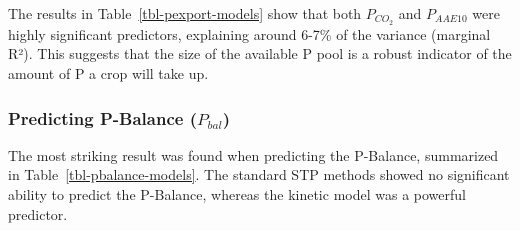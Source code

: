 \documentclass[
  a4paper,
]{article}
\begin{document}
The results in Table~\ref{tbl-pexport-models} show that both
\(P_{CO_2}\) and \(P_{AAE10}\) were highly significant predictors,
explaining around 6-7\% of the variance (marginal R²). This suggests
that the size of the available P pool is a robust indicator of the
amount of P a crop will take up.

\subsubsection{\texorpdfstring{Predicting P-Balance
(\(P_{bal}\))}{Predicting P-Balance (P\_\{bal\})}}\label{sec-pbalance}

The most striking result was found when predicting the P-Balance,
summarized in Table~\ref{tbl-pbalance-models}. The standard STP methods
showed no significant ability to predict the P-Balance, whereas the
kinetic model was a powerful predictor.
\end{document}
